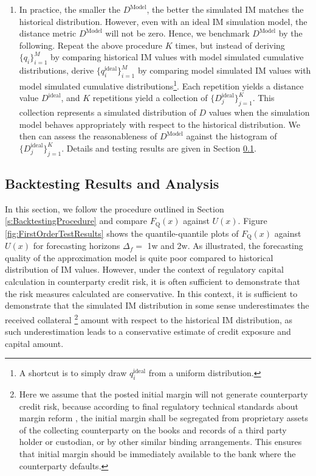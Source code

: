 \documentclass[preprint,12pt]{elsarticle}
\begin{document}
\begin{enumerate}
\item In practice, the smaller the $D^{\textrm{Model}}$, the better the simulated IM matches the historical distribution. However, even with an ideal IM simulation model, the distance metric $D^{\textrm{Model}}$ will not be zero. Hence, we benchmark $D^{\textrm{Model}}$ by the following. Repeat the above procedure $K$ times, but instead of deriving $\{q_i\}^M_{i=1}$ by comparing historical IM values with model simulated cumulative distributions, derive $\{q^{\textrm{ideal}}_i\}^M_{i=1}$ by comparing model simulated IM values with model simulated cumulative distributions\footnote{A shortcut is to simply draw $q^{\textrm{ideal}}_i$ from a uniform distribution.}. Each repetition yields a distance value $D^{\textrm{ideal}}$, and $K$ repetitions yield a collection of $\{D^{\textrm{ideal}}_j\}_{j=1}^K$. This collection represents a simulated distribution of $D$ values when the simulation model behaves appropriately with respect to the historical distribution. We then can assess the reasonableness of $D^{\textrm{Model}}$  against the histogram of $\{D^{\textrm{ideal}}_j\}_{j=1}^K$. Details and testing results are given in Section \ref{s:Results}.

\end{enumerate}

\subsection{Backtesting Results and Analysis}\label{s:Results}

In this section, we follow the procedure outlined in Section \ref{s:BacktestingProcedure} and compare $F_{\textrm{Q}}(x)$ against $U(x)$. Figure \ref{fig:FirstOrderTestResults} shows the quantile-quantile plots of $F_{\textrm{Q}}(x)$ against $U(x)$ for forecasting horizons $\Delta_f=$ 1w and 2w. As illustrated, the forecasting quality of the approximation model is quite poor compared to  historical distribution of IM values. However, under the context of regulatory capital calculation in counterparty credit risk, it is often sufficient to demonstrate that the risk measures calculated are conservative. In this context, it is sufficient to demonstrate that the simulated IM distribution in some sense underestimates the received collateral  \footnote{Here we assume that the posted initial margin will not generate counterparty credit risk, because according to final regulatory technical standards about margin reform \cite{EURTSMarginReform}, the initial margin shall be segregated from proprietary assets of the collecting counterparty on the books and records of a third party holder or custodian, or by other similar binding arrangements. This ensures that initial margin should be immediately available to the bank where the counterparty defaults.} amount with respect to the historical IM distribution, as such underestimation leads to a conservative estimate of credit exposure and capital amount.
\end{document}
